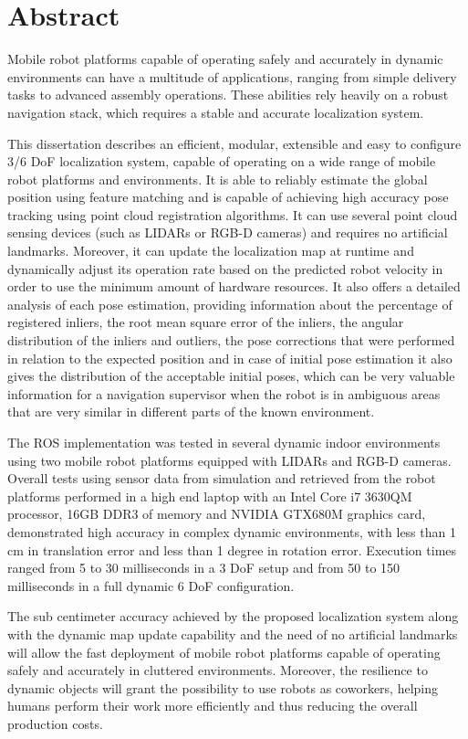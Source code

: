 \chapter*{Abstract}

Mobile robot platforms capable of operating safely and accurately in dynamic environments can have a multitude of applications, ranging from simple delivery tasks to advanced assembly operations. These abilities rely heavily on a robust navigation stack, which requires a stable and accurate localization system.

This dissertation describes an efficient, modular, extensible and easy to configure 3/6 DoF localization system, capable of operating on a wide range of mobile robot platforms and environments. It is able to reliably estimate the global position using feature matching and is capable of achieving high accuracy pose tracking using point cloud registration algorithms. It can use several point cloud sensing devices (such as LIDARs or RGB-D cameras) and requires no artificial landmarks. Moreover, it can update the localization map at runtime and dynamically adjust its operation rate based on the predicted robot velocity in order to use the minimum amount of hardware resources. It also offers a detailed analysis of each pose estimation, providing information about the percentage of registered inliers, the root mean square error of the inliers, the angular distribution of the inliers and outliers, the pose corrections that were performed in relation to the expected position and in case of initial pose estimation it also gives the distribution of the acceptable initial poses, which can be very valuable information for a navigation supervisor when the robot is in ambiguous areas that are very similar in different parts of the known environment.

The ROS implementation was tested in several dynamic indoor environments using two mobile robot platforms equipped with LIDARs and RGB-D cameras. Overall tests using sensor data from simulation and retrieved from the robot platforms performed in a high end laptop with an Intel Core i7 3630QM processor, 16GB DDR3 of memory and NVIDIA GTX680M graphics card, demonstrated high accuracy in complex dynamic environments, with less than 1 cm in translation error and less than 1 degree in rotation error. Execution times ranged from 5 to 30 milliseconds in a 3 DoF setup and from 50 to 150 milliseconds in a full dynamic 6 DoF configuration.

The sub centimeter accuracy achieved by the proposed localization system along with the dynamic map update capability and the need of no artificial landmarks will allow the fast deployment of mobile robot platforms capable of operating safely and accurately in cluttered environments. Moreover, the resilience to dynamic objects will grant the possibility to use robots as coworkers, helping humans perform their work more efficiently and thus reducing the overall production costs.



